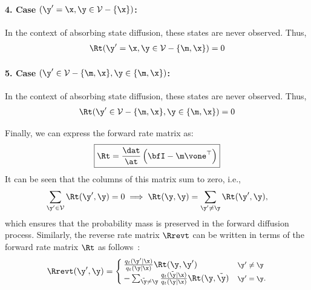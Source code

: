 \documentclass{article} %
\def\onehotset{\mathcal{V}}
\begin{document}
{\begin{appendices}
\paragraph{4. Case $(\y' = \x, \y \in \onehotset - \{\x\})$:} In the context of absorbing state diffusion, these states are never observed. Thus,
\begin{align}\label{eqn:mdlm_rate_neq_x_m}
    \Rt(\y' = \x, \y \in \onehotset - \{\m, \x\}) = 0
\end{align}

\paragraph{5. Case $(\y' \in \onehotset - \{\m, \x\}, \y \in \{\m, \x\})$:} In the context of absorbing state diffusion, these states are never observed. Thus,
\begin{align}
    \Rt(\y' \in \onehotset - \{\m, \x\}, \y \in \{\m, \x\}) = 0
\end{align}

Finally, we can express the forward rate matrix as:
\begin{align}\label{eqn:mdlm_rate_matrix}
    \boxed{\Rt = \frac{\dat}{\at}\left(\bfI - \m \vone^\top\right)}
\end{align}
It can be seen that the columns of this matrix sum to zero, i.e., 
\begin{align}
    \sum_{\y' \in \onehotset}\Rt(\y', \y) = 0 \implies \Rt(\y, \y) = \sum_{\y' \neq \y}\Rt(\y', \y),
\end{align}
which ensures that the probability mass is preserved in the forward diffusion process. Similarly, the reverse rate matrix $\Rrevt$ can be written in terms of the forward rate matrix $\Rt$ as follows~\citep{lou2023discrete}:
\begin{align}\label{eqn:true_reverse_rate_property}
    \Rrevt(\y', \y) = 
        \begin{cases}
            \frac{q_t(\y'|\x)}{q_t(\y | \x)}\Rt(\y, \y') & \text{\footnotesize $\y' \neq \y$}\\
            - \sum_{\tilde \y \neq \y}\frac{q_t(\tilde \y|\x)}{q_t(\y | \x)}\Rt(\y, \tilde \y) & \text{\footnotesize $\y' = \y$}.
        \end{cases}
\end{align}



\end{appendices}}
\end{document}
